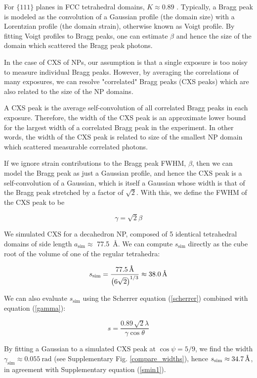 \documentclass [12pt,fleqn]{article}
\newcommand{\angstrom}{\textup{\AA}}
\def \be {\begin{equation}}
\def \ee {\end{equation}}
\begin{document}
For $\{111\}$ planes in FCC tetrahedral domains, $K \approx 0.89$ \cite{langford1978scherrer}. Typically, a Bragg peak is modeled as the convolution of a Gaussian profile (the domain size) with a Lorentzian profile (the domain strain), otherwise known as Voigt profile. By fitting Voigt profiles to Bragg peaks, one can estimate $\beta$ and hence the size of the domain which scattered the Bragg peak photons.

In the case of CXS of NPs, our assumption is that a single exposure is too noisy to measure individual Bragg peaks. However, by averaging the correlations of many exposures, we can resolve "correlated" Bragg peaks (CXS peaks) which are also related to the size of the NP domains.

A CXS peak is the average self-convolution of all correlated Bragg peaks in each exposure. Therefore, the width of the CXS peak is an approximate lower bound for the largest width of a correlated Bragg peak in the experiment. In other words, the width of the CXS peak is related to size of the smallest NP domain which scattered measurable correlated photons.

If we ignore strain contributions to the Bragg peak FWHM, $\beta$, then we can model the Bragg peak as just a Gaussian profile, and hence the CXS peak is a self-convolution of a Gaussian, which is itself a Gaussian whose width is that of the Bragg peak stretched by a factor of $\sqrt{2}$. With this, we define the FWHM of the CXS peak to be 

\be \label{gamma}
\gamma = \sqrt{2} \beta
\ee

We simulated CXS for a decahedron NP, composed of 5 identical tetrahedral domains of side length $a_{\text{sim}}\approx$ \SI{77.5}{\angstrom}. We can compute $s_{\text{sim}}$ directly as the cube root of the volume of one of the regular tetrahedra:

\be \label{smin1}
s_{\text{sim}} = \frac{ \SI{77.5}{\angstrom}} {\left( 6\sqrt{2} \right )^{1/3}} \approx \SI{38.0}{\angstrom}
\ee

We can also evaluate $s_{\text{sim}}$ using the Scherrer equation (\ref{scherrer}) combined with equation (\ref{gamma}): 

\be \label{domain_size}
s = \frac{0.89 \, \sqrt{2} \lambda}{ \gamma \cos \theta}
\ee

By fitting a Gaussian to a simulated CXS peak at $\cos \psi = {5/9}$, we find the width $\gamma_{\text{sim}} \approx \SI{0.055}{\radian}$ (see Supplementary Fig. \ref{compare_widths}), hence $s_{\text{sim}} \approx  \SI{34.7}{\angstrom}$, in agreement with Supplementary equation (\ref{smin1}).
\end{document}
